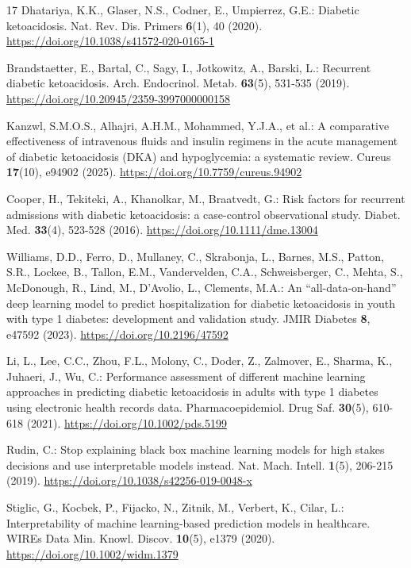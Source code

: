 \documentclass[pdflatex,sn-basic,Numbered]{sn-jnl}
\begin{document}
\begin{thebibliography}{17}
 Dhatariya, K.K., Glaser, N.S., Codner, E., Umpierrez, G.E.: Diabetic ketoacidosis. Nat. Rev. Dis. Primers \textbf{6}(1), 40 (2020). \url{https://doi.org/10.1038/s41572-020-0165-1}

 Brandstaetter, E., Bartal, C., Sagy, I., Jotkowitz, A., Barski, L.: Recurrent diabetic ketoacidosis. Arch. Endocrinol. Metab. \textbf{63}(5), 531-535 (2019). \url{https://doi.org/10.20945/2359-3997000000158}

 Kanzwl, S.M.O.S., Alhajri, A.H.M., Mohammed, Y.J.A., et al.: A comparative effectiveness of intravenous fluids and insulin regimens in the acute management of diabetic ketoacidosis (DKA) and hypoglycemia: a systematic review. Cureus \textbf{17}(10), e94902 (2025). \url{https://doi.org/10.7759/cureus.94902}

 Cooper, H., Tekiteki, A., Khanolkar, M., Braatvedt, G.: Risk factors for recurrent admissions with diabetic ketoacidosis: a case-control observational study. Diabet. Med. \textbf{33}(4), 523-528 (2016). \url{https://doi.org/10.1111/dme.13004}

 Williams, D.D., Ferro, D., Mullaney, C., Skrabonja, L., Barnes, M.S., Patton, S.R., Lockee, B., Tallon, E.M., Vandervelden, C.A., Schweisberger, C., Mehta, S., McDonough, R., Lind, M., D'Avolio, L., Clements, M.A.: An ``all-data-on-hand'' deep learning model to predict hospitalization for diabetic ketoacidosis in youth with type 1 diabetes: development and validation study. JMIR Diabetes \textbf{8}, e47592 (2023). \url{https://doi.org/10.2196/47592}

 Li, L., Lee, C.C., Zhou, F.L., Molony, C., Doder, Z., Zalmover, E., Sharma, K., Juhaeri, J., Wu, C.: Performance assessment of different machine learning approaches in predicting diabetic ketoacidosis in adults with type 1 diabetes using electronic health records data. Pharmacoepidemiol. Drug Saf. \textbf{30}(5), 610-618 (2021). \url{https://doi.org/10.1002/pds.5199}

 Rudin, C.: Stop explaining black box machine learning models for high stakes decisions and use interpretable models instead. Nat. Mach. Intell. \textbf{1}(5), 206-215 (2019). \url{https://doi.org/10.1038/s42256-019-0048-x}

 Stiglic, G., Kocbek, P., Fijacko, N., Zitnik, M., Verbert, K., Cilar, L.: Interpretability of machine learning-based prediction models in healthcare. WIREs Data Min. Knowl. Discov. \textbf{10}(5), e1379 (2020). \url{https://doi.org/10.1002/widm.1379}


\end{thebibliography}
\end{document}
